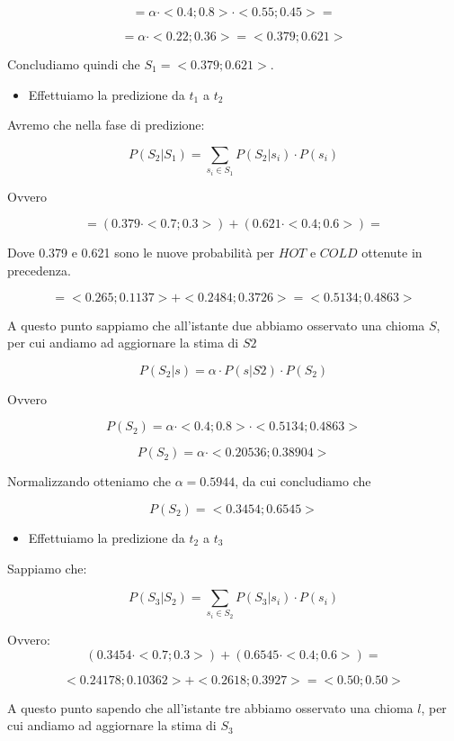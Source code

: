 \documentclass{article}
\begin{document}
\[
= \alpha \cdot <0.4; 0.8> \cdot < 0.55 ; 0.45 > =
\]

\[
= \alpha \cdot <0.22; 0.36> = <0.379; 0.621>
\]

Concludiamo quindi che $S_1 = <0.379; 0.621>$.

\pagebreak

\begin{itemize}
	\item Effettuiamo la predizione da $t_1$ a $t_2$
\end{itemize}

Avremo che nella fase di predizione:

\[
P(S_2 | S_1) = \sum_{s_i \in S_1}  P(S_2 | s_i) \cdot P(s_i)
\]

Ovvero

\[
 = (0.379 \cdot <0.7 ; 0.3> ) + (0.621 \cdot <0.4 ; 0.6> ) = 
\]

Dove 0.379 e 0.621 sono le nuove probabilità per $HOT$ e $COLD$ ottenute in precedenza.


\[
= <0.265 ; 0.1137> + <0.2484 ; 0.3726>  = <0.5134 ; 0.4863>
\]

A questo punto sappiamo che all'istante due abbiamo osservato una chioma $S$, per cui andiamo ad aggiornare la stima di $S2$

\[
P(S_2 | s) = \alpha \cdot P(s | S2) \cdot P(S_2)
\]

Ovvero

\[
P(S_2) = \alpha \cdot < 0.4; 0.8 > \cdot  < 0.5134 ; 0.4863>
\]

\[
P(S_2) = \alpha \cdot < 0.20536; 0.38904 > 
\]

Normalizzando otteniamo che $\alpha = 0.5944$, da cui
concludiamo che 

\[
P(S_2) = <0.3454; 0.6545>
\]

\begin{itemize}
	\item Effettuiamo la predizione da $t_2$ a $t_3$
\end{itemize}

Sappiamo che:

\[
P(S_3 | S_2) = \sum_{s_i \in S_2} P(S_3 | s_i) \cdot P(s_i)
\]

Ovvero:
\[
 (0.3454 \cdot <0.7 ; 0.3> ) + (0.6545 \cdot <0.4 ; 0.6> ) = 
\]

\[
	<0.24178 ; 0.10362> + <0.2618 ; 0.3927>  = <0.50; 0.50> 
\]

A questo punto sapendo che all'istante tre abbiamo osservato una chioma $l$, per cui andiamo ad aggiornare la stima di $S_3$
\end{document}
